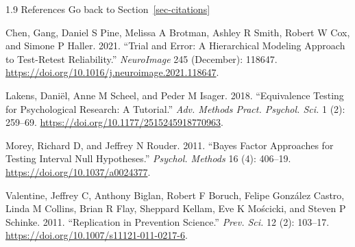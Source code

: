 \documentclass[
  ignorenonframetext,
]{beamer}
\newlength{\cslhangindent}
\newenvironment{CSLReferences}[2] %
 {\begin{list}{}{%
  \setlength{\itemindent}{0pt}
  \setlength{\leftmargin}{0pt}
  \setlength{\parsep}{0pt}
  \ifodd #1
   \setlength{\leftmargin}{\cslhangindent}
   \setlength{\itemindent}{-1\cslhangindent}
  \fi
  \setlength{\itemsep}{#2\baselineskip}}}
 {\end{list}}
\begin{document}
\begin{frame}{1.9 References}
\label{sec-refs}
Go back to Section~\ref{sec-citations}

\label{references}

\label{refs}
\begin{CSLReferences}{1}{0}
Chen, Gang, Daniel S Pine, Melissa A Brotman, Ashley R Smith, Robert W
Cox, and Simone P Haller. 2021. {``Trial and Error: A Hierarchical
Modeling Approach to Test-Retest Reliability.''} \emph{NeuroImage} 245
(December): 118647.
\url{https://doi.org/10.1016/j.neuroimage.2021.118647}.

Lakens, Daniël, Anne M Scheel, and Peder M Isager. 2018. {``Equivalence
Testing for Psychological Research: A Tutorial.''} \emph{Adv. Methods
Pract. Psychol. Sci.} 1 (2): 259--69.
\url{https://doi.org/10.1177/2515245918770963}.

Morey, Richard D, and Jeffrey N Rouder. 2011. {``Bayes Factor Approaches
for Testing Interval Null Hypotheses.''} \emph{Psychol. Methods} 16 (4):
406--19. \url{https://doi.org/10.1037/a0024377}.

Valentine, Jeffrey C, Anthony Biglan, Robert F Boruch, Felipe González
Castro, Linda M Collins, Brian R Flay, Sheppard Kellam, Eve K Mościcki,
and Steven P Schinke. 2011. {``Replication in Prevention Science.''}
\emph{Prev. Sci.} 12 (2): 103--17.
\url{https://doi.org/10.1007/s11121-011-0217-6}.

\end{CSLReferences}
\end{frame}
\end{document}
